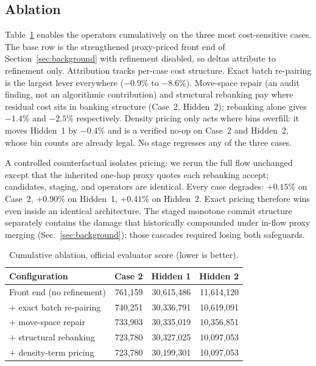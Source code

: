 \subsection{Ablation}\label{sec:ablation}

Table~\ref{tab:ablation} enables the operators cumulatively on the three most cost-sensitive cases. The base row is the strengthened proxy-priced front end of Section~\ref{sec:background} with refinement disabled, so deltas attribute to refinement only. Attribution tracks per-case cost structure. Exact batch re-pairing is the largest lever everywhere ($-0.9\%$ to $-8.6\%$). Move-space repair (an audit finding, not an algorithmic contribution) and structural rebanking pay where residual cost sits in banking structure (Case~2, Hidden~2); rebanking alone gives $-1.4\%$ and $-2.5\%$ respectively. Density pricing only acts where bins overfill: it moves Hidden~1 by $-0.4\%$ and is a verified no-op on Case~2 and Hidden~2, whose bin counts are already legal. No stage regresses any of the three cases.

A controlled counterfactual isolates pricing: we rerun the full flow unchanged except that the inherited one-hop proxy quotes each rebanking accept; candidates, staging, and operators are identical. Every case degrades: $+0.15\%$ on Case~2, $+0.90\%$ on Hidden~1, $+0.41\%$ on Hidden~2. Exact pricing therefore wins even inside an identical architecture. The staged monotone commit structure separately contains the damage that historically compounded under in-flow proxy merging (Sec.~\ref{sec:background}); those cascades required losing both safeguards.

\begin{table}[t]
\centering
\caption{Cumulative ablation, official evaluator score (lower is better).}
\label{tab:ablation}
\footnotesize
\begin{tabular}{@{}lrrr@{}}
\toprule
Configuration & Case 2 & Hidden 1 & Hidden 2 \\
\midrule
Front end (no refinement)       & 761{,}159 & 30{,}615{,}486 & 11{,}614{,}120 \\
$+$ exact batch re-pairing      & 740{,}251 & 30{,}336{,}791 & 10{,}619{,}091 \\
$+$ move-space repair           & 733{,}903 & 30{,}335{,}019 & 10{,}356{,}851 \\
$+$ structural rebanking        & 723{,}780 & 30{,}327{,}025 & 10{,}097{,}053 \\
$+$ density-term pricing        & 723{,}780 & 30{,}199{,}301 & 10{,}097{,}053 \\
\bottomrule
\end{tabular}
\end{table}

